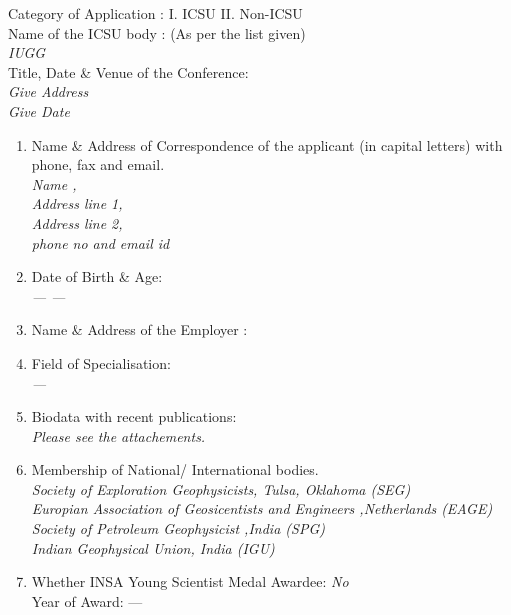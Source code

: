 \documentclass[12pt,a4paper]{article}
\begin{document}
\noindent
Category of Application : 
I.   ICSU  \checkmark  \hspace{2cm}     
II.  Non-ICSU\\[1em]
%
%
Name of the  ICSU body : (As per the list given)\\
\hspace*{.5cm} \textit{IUGG}\\[1em]
%
%
Title, Date \& Venue of the Conference:  \\[1em]
\indent \textit{Give Address } \\
\indent \textit{Give Date}\\
%
%
\begin{enumerate}
	\item	Name \& Address of Correspondence of
			the applicant (in capital letters) with 
			phone, fax and email. \\[1em]
			\textit{
			Name , \\
			Address line 1, \\
			Address line 2, \\
			phone no and email id
			}
			
	\item Date of Birth \& Age:\\[1em]
			\textit{	--- ---}

	\item Name \& Address of the Employer : \\[1em]
			\textit{ 			}
			
	\item Field of Specialisation: \\[1em]
			\textit{  --- }
	
	\item Biodata with recent publications: \\[1em]
			\textit{Please see the attachements.}
	
	\item Membership of National/ International  bodies. \\[1em] 
			\textit{Society of Exploration Geophysicists, Tulsa, Oklahoma (SEG)\\
			        Europian Association of Geosicentists and Engineers ,Netherlands (EAGE)\\
			        Society of Petroleum Geophysicist ,India (SPG)\\
			        Indian Geophysical Union, India (IGU)}
			        
	\item Whether INSA Young Scientist Medal Awardee: 	\textit{No}  \\ 
			\hspace{1cm}  Year of Award:  ---


\end{enumerate}
\end{document}
